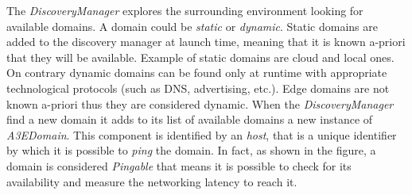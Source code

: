 The \textit{DiscoveryManager} explores the surrounding environment looking for available domains. A domain could be \textit{static} or \textit{dynamic}. Static domains are added to the discovery manager at launch time, meaning that it is known a-priori that they will be available. Example of static domains are cloud and local ones. On contrary dynamic domains can be found only at runtime with appropriate technological protocols (such as DNS, advertising, etc.). Edge domains are not known a-priori thus they are considered dynamic. When the \textit{DiscoveryManager} find a new domain it adds to its list of available domains a new instance of  \textit{A3EDomain}. This component is identified by an \textit{host}, that is a unique identifier by which it is possible to \textit{ping} the domain. In fact, as shown in the figure, a domain is considered \textit{Pingable} that means it is possible to check for its availability and measure the networking latency to reach it.





